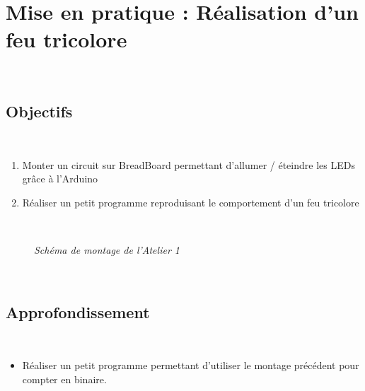 \section{Mise en pratique : Réalisation d'un feu tricolore}\\

\subsection{Objectifs}\\
\begin{enumerate}\\
	\item Monter un circuit sur BreadBoard permettant d'allumer / éteindre les LEDs grâce à l'Arduino
	\\
	\item Réaliser un petit programme reproduisant le comportement d'un feu tricolore
	\\
\end{enumerate}\\

\begin{figure}[H]
	\begin{center}
	\end{center}
	\caption{ \textit{ Schéma de montage de l'Atelier 1}}
\end{figure}\\

\subsection{Approfondissement}\\

\begin{itemize}\\
	\item Réaliser un petit programme permettant d'utiliser le montage précédent pour compter en binaire.
\end{itemize}\\




